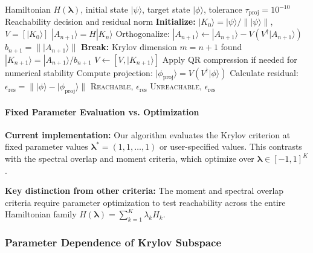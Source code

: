 \documentclass[ a4paper, 
                amsfonts, 
                amssymb, 
                amsmath, 
                reprint, 
                showkeys, 
                nofootinbib,
                superscriptaddress, 
                onecolumn, 
                notitlepage,
                aps,
                pra,
                longbibliography]{revtex4-1}
\theoremstyle{definition}
\begin{document}
\begin{algorithm}[H]
\caption{Krylov Projection-Residual Test (Implemented)}
\label{alg:krylov_projection_impl}
\begin{algorithmic}[1]
\REQUIRE Hamiltonian $H(\boldsymbol{\lambda})$, initial state $|\psi\rangle$, target state $|\phi\rangle$, tolerance $\tau_{\text{proj}} = 10^{-10}$
\ENSURE Reachability decision and residual norm
\STATE \textbf{Initialize:} $|K_0\rangle = |\psi\rangle/\||\psi\rangle\|$, $V = [|K_0\rangle]$
    \STATE $|A_{n+1}\rangle = H|K_n\rangle$
    \STATE Orthogonalize: $|A_{n+1}\rangle \leftarrow |A_{n+1}\rangle - V(V^\dagger|A_{n+1}\rangle)$ 
    \STATE $b_{n+1} = \||A_{n+1}\rangle\|$
        \STATE \textbf{Break:} Krylov dimension $m = n+1$ found
    \ENDIF
    \STATE $|K_{n+1}\rangle = |A_{n+1}\rangle/b_{n+1}$
    \STATE $V \leftarrow [V, |K_{n+1}\rangle]$
    \STATE Apply QR compression if needed for numerical stability
\ENDFOR
\STATE Compute projection: $|\phi_{\text{proj}}\rangle = V(V^\dagger |\phi\rangle)$
\STATE Calculate residual: $\epsilon_{\text{res}} = \||\phi\rangle - |\phi_{\text{proj}}\rangle\|$
    \RETURN \textsc{Reachable}, $\epsilon_{\text{res}}$
\ELSE
    \RETURN \textsc{Unreachable}, $\epsilon_{\text{res}}$
\ENDIF
\end{algorithmic}
\end{algorithm}


\paragraph{Fixed Parameter Evaluation vs. Optimization}

\textbf{Current implementation:} Our algorithm evaluates the Krylov criterion at fixed parameter values $\boldsymbol{\lambda}^* = (1, 1, \ldots, 1)$ or user-specified values. This contrasts with the spectral overlap and moment criteria, which optimize over $\boldsymbol{\lambda} \in [-1,1]^K$.

\textbf{Key distinction from other criteria:} The moment and spectral overlap criteria require parameter optimization to test reachability across the entire Hamiltonian family $H(\boldsymbol{\lambda}) = \sum_{k=1}^K \lambda_k H_k$. 
\subsubsection{Parameter Dependence of Krylov Subspace}
\end{document}
